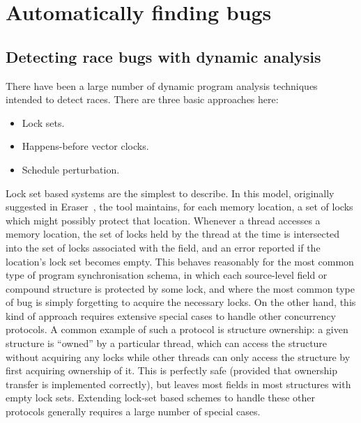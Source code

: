 \section{Automatically finding bugs}

\subsection{Detecting race bugs with dynamic analysis}

There have been a large number of dynamic program analysis techniques
intended to detect races.  There are three basic approaches here:

\begin{itemize}
\item Lock sets.
\item Happens-before vector clocks.
\item Schedule perturbation.
\end{itemize}

Lock set based systems are the simplest to describe.  In this model,
originally suggested in Eraser~\cite{Savage1997}, the tool maintains,
for each memory location, a set of locks which might possibly protect
that location.  Whenever a thread accesses a memory location, the set
of locks held by the thread at the time is intersected into the set of
locks associated with the field, and an error reported if the
location's lock set becomes empty.  This behaves reasonably for the
most common type of program synchronisation schema, in which each
source-level field or compound structure is protected by some lock,
and where the most common type of bug is simply forgetting to acquire
the necessary locks.  On the other hand, this kind of approach
requires extensive special cases to handle other concurrency
protocols.  A common example of such a protocol is structure
ownership: a given structure is ``owned'' by a particular thread,
which can access the structure without acquiring any locks while other
threads can only access the structure by first acquiring ownership of
it.  This is perfectly safe (provided that
ownership transfer is implemented correctly), but leaves most fields
in most structures with empty lock sets.  Extending lock-set based
schemes to handle these other protocols generally requires a large
number of special cases.

